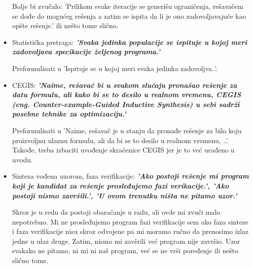 \documentclass[a4paper]{report}
\begin{document}
\begin{itemize}
	Bolje bi zvučalo: 'Prilikom svake iteracije se generišu ograničenja, rešavačem se dođe do mogućeg rešenja a zatim se ispita da li je ono zadovoljavajuće kao opšte rešenje.' ili nešto tome slično.
    
    \item Statistička pretraga: \textbf{\textit{'Svaka jedinka populacije se ispituje u kojoj meri zadovoljava specikacije željenog programa.'}}
    
    Preformulisati u 'Ispituje se u kojoj meri svaka jedinka zadovoljva..'.
    
    \item CEGIS: \textbf{\textit{'Naime, rešavač bi u svakom slučaju pronašao rešenje za datu formulu, ali kako bi se to desilo u realnom vremenu, CEGIS (eng. Counter-example-Guided Inductive Synthesis) u sebi sadrži posebne tehnike za optimizaciju.'}}
    
    Preformulisati u 'Naime, rešavač je u stanju da pronađe rešenje za bilo koju proizvoljnu ulaznu formulu, ali da bi se to desilo u realnom vremenu, ..'. Takođe, treba izbaciti uvođenje skraćenice CEGIS jer je to već urađeno u uvodu.
    
    \item Sinteza vođena uzorom, faza verifikacije: \textbf{\textit{'Ako postoji rešenje mi program koji je kandidat za rešenje prosleđujemo fazi verikacije.', 'Ako postoji nismo završili.', 'U ovom trenutku ništa ne pitamo uzor.'}}
    
    Skroz je u redu da postoji obaraćanje u radu, ali ovde mi zvuči malo nepotrebno. Mi ne prosleđujemo program fazi verifikacije sem ako faza sinteze i faza verifikacije nisu skroz odvojene pa mi moramo ručno da prenosimo izlaz jedne u ulaz druge. Zatim, nismo mi zavšrili već program nije završio. Uzor svakako ne pitamo, ni mi ni naš program, već se ne vrši poređenje ili nešto slično tome.    
\end{itemize}
\end{document}
